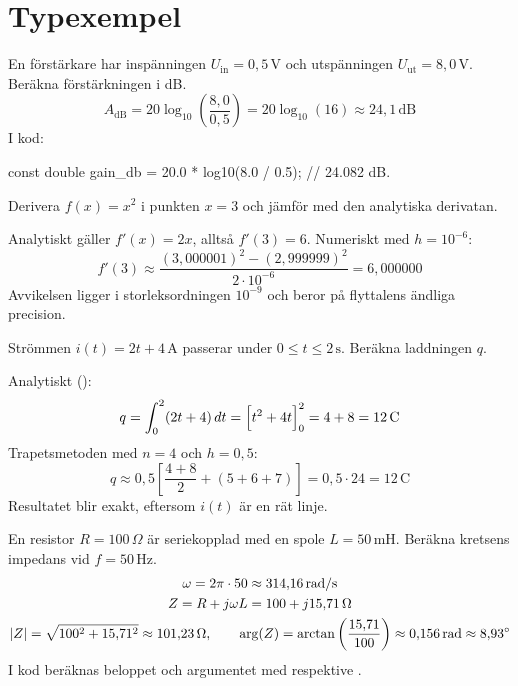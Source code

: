 \section{Typexempel}
\label{c18:sec:typexempel}

\begin{exempel}
En förstärkare har inspänningen $U_{\text{in}} = 0{,}5\,\text{V}$ och utspänningen
$U_{\text{ut}} = 8{,}0\,\text{V}$. Beräkna förstärkningen i dB.
\[
  A_{\text{dB}} = 20\log_{10}\left(\frac{8{,}0}{0{,}5}\right) = 20\log_{10}(16) \approx
  24{,}1\,\text{dB}
\]
I kod:

\begin{ccode}
const double gain_db = 20.0 * log10(8.0 / 0.5); // 24.082 dB.
\end{ccode}
\end{exempel}

\begin{exempel}
Derivera $f(x) = x^2$ i punkten $x = 3$ och jämför med den analytiska derivatan.

Analytiskt gäller $f'(x) = 2x$, alltså $f'(3) = 6$. Numeriskt med $h = 10^{-6}$:
\[
  f'(3) \approx \frac{(3{,}000001)^2 - (2{,}999999)^2}{2 \cdot 10^{-6}} = 6{,}000000
\]
Avvikelsen ligger i storleksordningen $10^{-9}$ och beror på flyttalens ändliga precision.
\end{exempel}

\begin{exempel}
Strömmen $i(t) = 2t + 4\,\text{A}$ passerar under $0 \leq t \leq 2\,\text{s}$. Beräkna
laddningen $q$.

Analytiskt ():
\[
  q = \int_0^2 (2t + 4)\,dt = \Bigl[t^2 + 4t\Bigr]_0^2 = 4 + 8 = 12\,\text{C}
\]
Trapetsmetoden med $n = 4$ och $h = 0{,}5$:
\[
  q \approx 0{,}5\left[\frac{4 + 8}{2} + (5 + 6 + 7)\right] = 0{,}5 \cdot 24 = 12\,\text{C}
\]
Resultatet blir exakt, eftersom $i(t)$ är en rät linje.
\end{exempel}

\begin{exempel}
En resistor $R = 100\,\Omega$ är seriekopplad med en spole $L = 50\,\text{mH}$. Beräkna kretsens
impedans vid $f = 50\,\text{Hz}$.
\begin{gather*}
  \omega = 2\pi \cdot 50 \approx 314{,}16\,\text{rad/s} \\
  Z = R + j\omega L = 100 + j15{,}71\,\Omega \\
  \lvert Z\rvert = \sqrt{100^2 + 15{,}71^2} \approx 101{,}23\,\Omega, \qquad
  \arg(Z) = \arctan\left(\frac{15{,}71}{100}\right) \approx 0{,}156\,\text{rad} \approx
  8{,}93^{\circ}
\end{gather*}
I kod beräknas beloppet och argumentet med  respektive
.
\end{exempel}

